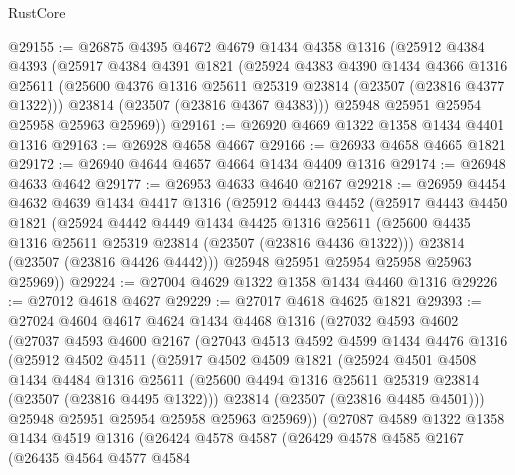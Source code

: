 \begin{lexlean}{RustCore}
\begin{coremodule}
@29155 := @26875
    @4395
    @4672
    @4679
    @1434
    @4358
    @1316
    (@25912
      @4384
      @4393
      (@25917
        @4384
        @4391
        @1821
        (@25924
          @4383
          @4390
          @1434
          @4366
          @1316
          @25611
          (@25600 @4376 @1316 @25611 @25319 @23814 (@23507 (@23816 @4377 @1322)))
          @23814
          (@23507 (@23816 @4367 @4383)))
        @25948
        @25951
        @25954
        @25958
        @25963
        @25969))
@29161 := @26920 @4669 @1322 @1358 @1434 @4401 @1316
@29163 := @26928 @4658 @4667
@29166 := @26933 @4658 @4665 @1821
@29172 := @26940 @4644 @4657 @4664 @1434 @4409 @1316
@29174 := @26948 @4633 @4642
@29177 := @26953 @4633 @4640 @2167
@29218 := @26959
    @4454
    @4632
    @4639
    @1434
    @4417
    @1316
    (@25912
      @4443
      @4452
      (@25917
        @4443
        @4450
        @1821
        (@25924
          @4442
          @4449
          @1434
          @4425
          @1316
          @25611
          (@25600 @4435 @1316 @25611 @25319 @23814 (@23507 (@23816 @4436 @1322)))
          @23814
          (@23507 (@23816 @4426 @4442)))
        @25948
        @25951
        @25954
        @25958
        @25963
        @25969))
@29224 := @27004 @4629 @1322 @1358 @1434 @4460 @1316
@29226 := @27012 @4618 @4627
@29229 := @27017 @4618 @4625 @1821
@29393 := @27024
    @4604
    @4617
    @4624
    @1434
    @4468
    @1316
    (@27032
      @4593
      @4602
      (@27037
        @4593
        @4600
        @2167
        (@27043
          @4513
          @4592
          @4599
          @1434
          @4476
          @1316
          (@25912
            @4502
            @4511
            (@25917
              @4502
              @4509
              @1821
              (@25924
                @4501
                @4508
                @1434
                @4484
                @1316
                @25611
                (@25600 @4494 @1316 @25611 @25319 @23814 (@23507 (@23816 @4495 @1322)))
                @23814
                (@23507 (@23816 @4485 @4501)))
              @25948
              @25951
              @25954
              @25958
              @25963
              @25969))
          (@27087
            @4589
            @1322
            @1358
            @1434
            @4519
            @1316
            (@26424
              @4578
              @4587
              (@26429
                @4578
                @4585
                @2167
                (@26435
                  @4564
                  @4577
                  @4584

\end{coremodule}
\end{lexlean}
